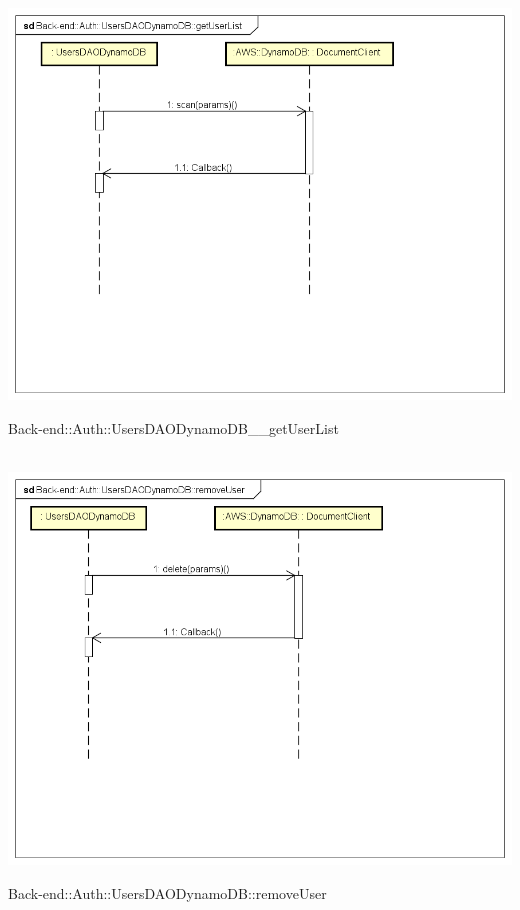 \\ \includegraphics[width=\textwidth,height=\textheight,keepaspectratio]{images/diagrams/back-end/Ufficial_Backend/Back-end__Auth__UsersDAODynamoDB__getUserList.png} 	\caption{Back-end::Auth::UsersDAODynamoDB__getUserList}
\\ \includegraphics[width=\textwidth,height=\textheight,keepaspectratio]{images/diagrams/back-end/Ufficial_Backend/Back-end__Auth__UsersDAODynamoDB__removeUser.png} 	\caption{Back-end::Auth::UsersDAODynamoDB::removeUser}
